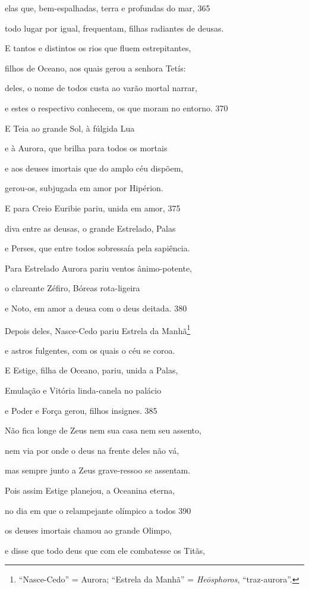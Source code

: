elas que, bem-espalhadas, terra e profundas do mar, \num{365}

todo lugar por igual, frequentam, filhas radiantes de deusas.

E tantos e distintos os rios que fluem estrepitantes,

filhos de Oceano, aos quais gerou a senhora Tetís:

deles, o nome de todos custa ao varão mortal narrar,

e estes o respectivo conhecem, os que moram no entorno. \num{370}

\quad{}E Teia ao grande Sol, à fúlgida Lua

e à Aurora, que brilha para todos os mortais

e aos deuses imortais que do amplo céu dispõem,

gerou-os, subjugada em amor por Hipérion.

E para Creio Euribie pariu, unida em amor, \num{375}

diva entre as deusas, o grande Estrelado, Palas

e Perses, que entre todos sobressaía pela sapiência.

Para Estrelado Aurora pariu ventos ânimo-potente,

o clareante Zéfiro, Bóreas rota-ligeira

e Noto, em amor a deusa com o deus deitada. \num{380}

Depois deles, Nasce-Cedo pariu Estrela da Manhã\footnote{``Nasce-Cedo'' = Aurora; ``Estrela da Manhã'' = \emph{Heōsphoros}, ``traz-aurora''.}

e astros fulgentes, com os quais o céu se coroa.

\quad{}E Estige, filha de Oceano, pariu, unida a Palas,

Emulação e Vitória linda-canela no palácio

e Poder e Força gerou, filhos insignes. \num{385}

Não fica longe de Zeus nem sua casa nem seu assento,

nem via por onde o deus na frente deles não vá,

mas sempre junto a Zeus grave-ressoo se assentam.

Pois assim Estige planejou, a Oceanina eterna,

no dia em que o relampejante olímpico a todos \num{390}

os deuses imortais chamou ao grande Olimpo,

e disse que todo deus que com ele combatesse os Titãs,

